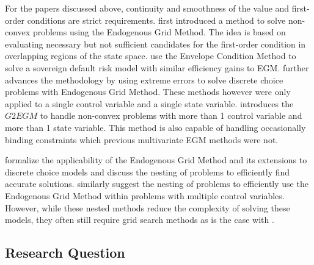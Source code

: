 \documentclass[\econtexRoot/SequentialEGM]{subfiles}
\begin{document}
For the papers discussed above, continuity and smoothness of the value and first-order conditions are strict requirements. \cite{Fella2014} first introduced a method to solve non-convex problems using the Endogenous Grid Method. The idea is based on evaluating necessary but not sufficient candidates for the first-order condition in overlapping regions of the state space. \cite{Arellano2016} use the Envelope Condition Method to solve a sovereign default risk model with similar efficiency gains to EGM. \cite{Iskhakov2017} further advances the methodology by using extreme errors to solve discrete choice problems with Endogenous Grid Method. These methods however were only applied to a single control variable and a single state variable. \cite{Druedahl2017} introduces the $G2EGM$ to handle non-convex problems with more than 1 control variable and more than 1 state variable. This method is also capable of handling occasionally binding constraints which previous multivariate EGM methods were not.

\cite{Clausen2020} formalize the applicability of the Endogenous Grid Method and its extensions to discrete choice models and discuss the nesting of problems to efficiently find accurate solutions.  \cite{Druedahl2021} similarly suggest the nesting of problems to efficiently use the Endogenous Grid Method within problems with multiple control variables. However, while these nested methods reduce the complexity of solving these models, they often still require grid search methods as is the case with \cite{Druedahl2021}.



\subsection{Research Question} %

\end{document}

